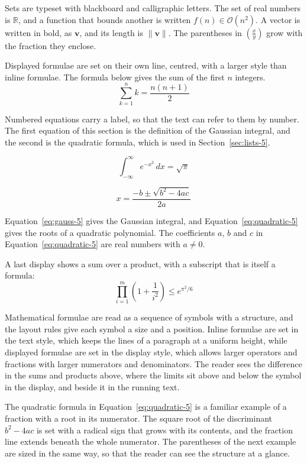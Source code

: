 \documentclass{article}
\begin{document}
Sets are typeset with blackboard and calligraphic letters. The set of real numbers is
$\mathbb{R}$, and a function that bounds another is written $f(n) \in \mathcal{O}(n^2)$.
A vector is written in bold, as $\mathbf{v}$, and its length is $\|\mathbf{v}\|$. The
parentheses in $\left( \frac{x}{y} \right)$ grow with the fraction they enclose.

Displayed formulae are set on their own line, centred, with a larger style than inline
formulae. The formula below gives the sum of the first $n$ integers.
\[
  \sum_{k=1}^{n} k = \frac{n(n+1)}{2}
\]

Numbered equations carry a label, so that the text can refer to them by number. The
first equation of this section is the definition of the Gaussian integral, and the
second is the quadratic formula, which is used in Section~\ref{sec:lists-5}.

\begin{equation}\label{eq:gauss-5}
  \int_{-\infty}^{\infty} e^{-x^{2}}\,dx = \sqrt{\pi}
\end{equation}

\begin{equation}\label{eq:quadratic-5}
  x = \frac{-b \pm \sqrt{b^{2}-4ac}}{2a}
\end{equation}

Equation~\ref{eq:gauss-5} gives the Gaussian integral, and
Equation~\ref{eq:quadratic-5} gives the roots of a quadratic polynomial. The coefficients
$a$, $b$ and $c$ in Equation~\ref{eq:quadratic-5} are real numbers with $a \neq 0$.

A last display shows a sum over a product, with a subscript that is itself a formula:
\[
  \prod_{i=1}^{m} \left( 1 + \frac{1}{i^{2}} \right) \leq e^{\pi^{2}/6}
\]

Mathematical formulae are read as a sequence of symbols with a structure, and the layout
rules give each symbol a size and a position. Inline formulae are set in the text style,
which keeps the lines of a paragraph at a uniform height, while displayed formulae are
set in the display style, which allows larger operators and fractions with larger
numerators and denominators. The reader sees the difference in the sums and products
above, where the limits sit above and below the symbol in the display, and beside it in
the running text.

The quadratic formula in Equation~\ref{eq:quadratic-5} is a familiar example of a
fraction with a root in its numerator. The square root of the discriminant
$b^{2}-4ac$ is set with a radical sign that grows with its contents, and the
fraction line extends beneath the whole numerator. The parentheses of the next example
are sized in the same way, so that the reader can see the structure at a glance.
\end{document}

